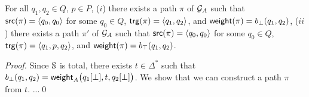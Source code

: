 \begin{lemma}[Completeness]
For all $q_1, q_2 \in Q$, $p\in P$, 
($i$) there exists a path $\pi$ of $\mathcal{G}_A$ 
such that $\src(\pi) = \<q_0, q_0>$ for some $q_0 \in Q$, 
$\trg(\pi) = \< q_1, q_2>$,
and $\mathsf{weight}(\pi) = b_\bot(q_1, q_2)$, 
($ii$) there exists a path $\pi'$ of $\mathcal{G}_A$ 
such that $\src(\pi) = \<q_0, q_0>$ for some $q_0 \in Q$, 
$\trg(\pi) = \< q_1, p, q_2>$,
and $\mathsf{weight}(\pi) = b_\top(q_1, q_2)$.
\end{lemma}
%
\begin{proof}
Since $\mathbb{S}$ is  total, there exists $t \in \Delta^*$ such that  
$b_\bot(q_1, q_2) = \mathsf{weight}_A\bigl(q_1[{\bot}], t, q_2[{\bot}]\bigr)$.
We show that we can construct a path $\pi$ from $t$.
...\qed
\end{proof}




